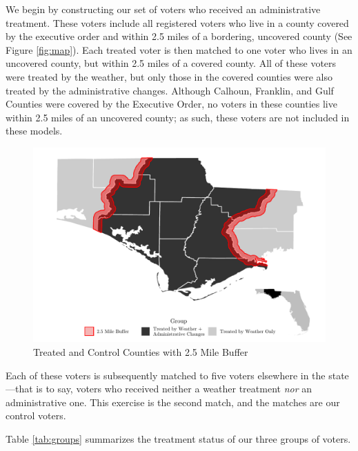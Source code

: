 \documentclass[
  12pt,
]{article}
\begin{document}
We begin by constructing our set of voters who received an administrative treatment. These voters include all registered voters who live in a county covered by the executive order and within 2.5 miles of a bordering, uncovered county (See Figure \ref{fig:map}). Each treated voter is then matched to one voter who lives in an uncovered county, but within 2.5 miles of a covered county. All of these voters were treated by the weather, but only those in the covered counties were also treated by the administrative changes. Although Calhoun, Franklin, and Gulf Counties were covered by the Executive Order, no voters in these counties live within 2.5 miles of an uncovered county; as such, these voters are not included in these models.

\begin{figure}[h]

{\centering \includegraphics{hurricane_michael_files/figure-latex/map-chunk-1} 

}

\caption{\label{fig:map}Treated and Control Counties with 2.5 Mile Buffer}\label{fig:map-chunk}
\end{figure}

Each of these voters is subsequently matched to five voters elsewhere in the state---that is to say, voters who received neither a weather treatment \emph{nor} an administrative one. This exercise is the second match, and the matches are our control voters.

Table \ref{tab:groups} summarizes the treatment status of our three groups of voters.
\end{document}
